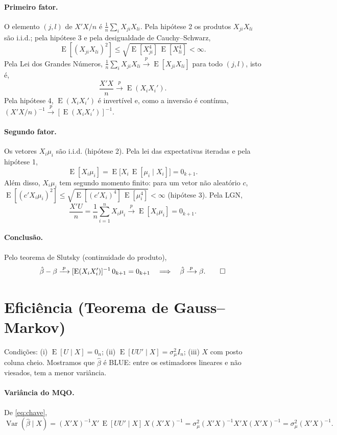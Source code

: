 \documentclass[12pt,a4paper]{article}
\newcommand{\E}{\operatorname{E}}
\newcommand{\Var}{\operatorname{Var}}
\newcommand{\convp}{\xrightarrow{\;p\;}}
\begin{document}
\paragraph{Primeiro fator.} O elemento $(j,l)$ de $X'X/n$ é $\frac1n\sum_i X_{ji}X_{li}$. Pela hipótese 2 os produtos $X_{ji}X_{li}$ são i.i.d.; pela hipótese 3 e pela desigualdade de Cauchy--Schwarz,
\[
  \E[(X_{ji}X_{li})^2]\le\sqrt{\E[X_{ji}^4]\,\E[X_{li}^4]}<\infty .
\]
Pela Lei dos Grandes Números, $\frac1n\sum_i X_{ji}X_{li}\convp \E[X_{ji}X_{li}]$ para todo $(j,l)$, isto é,
\[
  \frac{X'X}{n}\convp \E(X_iX_i').
\]
Pela hipótese 4, $\E(X_iX_i')$ é invertível e, como a inversão é contínua,
$\left(X'X/n\right)^{-1}\convp[\E(X_iX_i')]^{-1}$.

\paragraph{Segundo fator.} Os vetores $X_i\mu_i$ são i.i.d. (hipótese 2). Pela lei das expectativas iteradas e pela hipótese 1,
\[
  \E[X_i\mu_i]=\E\big[X_i\,\E[\mu_i\mid X_i]\big]=0_{k+1}.
\]
Além disso, $X_i\mu_i$ tem segundo momento finito: para um vetor não aleatório $c$, $\E[(c'X_i\mu_i)^2]\le\sqrt{\E[(c'X_i)^4]\,\E[\mu_i^4]}<\infty$ (hipótese 3). Pela LGN,
\[
  \frac{X'U}{n}=\frac1n\sum_{i=1}^n X_i\mu_i\convp \E[X_i\mu_i]=0_{k+1}.
\]

\paragraph{Conclusão.} Pelo teorema de Slutsky (continuidade do produto),
\[
  \hat\beta-\beta \convp [\E(X_iX_i')]^{-1}\,0_{k+1}=0_{k+1}
  \quad\Longrightarrow\quad \hat\beta\convp\beta. \qed
\]

\section{Eficiência (Teorema de Gauss--Markov)}
Condições: (i) $\E[U\mid X]=0_n$; (ii) $\E[UU'\mid X]=\sigma_\mu^2 I_n$; (iii) $X$ com posto coluna cheio. Mostramos que $\hat\beta$ é BLUE: entre os estimadores lineares e não viesados, tem a menor variância.

\paragraph{Variância do MQO.} De \eqref{eq:chave},
\[
  \Var(\hat\beta\mid X)=(X'X)^{-1}X'\,\E[UU'\mid X]\,X(X'X)^{-1}
  =\sigma_\mu^2(X'X)^{-1}X'X(X'X)^{-1}=\sigma_\mu^2(X'X)^{-1}.
\]
\end{document}
